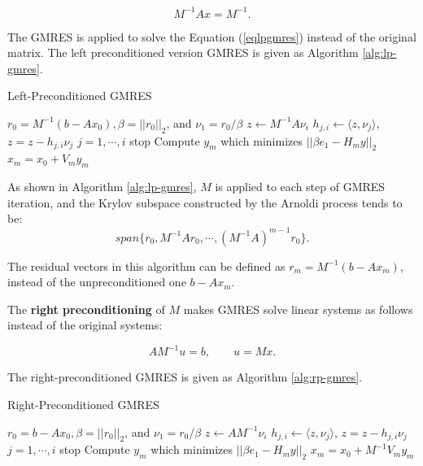 \begin{equation}
\label{eqlpgmres}
M^{-1}Ax=    M^{-1}.
\end{equation}

The GMRES is applied to solve the Equation (\ref{eqlpgmres}) instead of the original matrix. The left preconditioned version GMRES is given as Algorithm \ref{alg:lp-gmres}.

\begin{algorithm}[htbp]
	\caption{Left-Preconditioned GMRES}
	\label{alg:lp-gmres}
	\begin{algorithmic}[1]
		\State $r_0=M^{-1}(b-A x_0), \beta=||r_0||_2$, and $\nu_1=r_0/\beta$
		\State $z \leftarrow M^{-1}A\nu_i$
		\State $h_{j,i} \leftarrow \langle z,\nu_j\rangle$, $z = z- h_{j,i}\nu_j$ $j=1,\cdots,i$
		\State stop
		\Else
		\EndIf
		\EndFor
		\State Compute $y_m$ which minimizes $||\beta e_1-H_m y||_2$ 
		\State $x_m=x_0+V_my_m$
	\end{algorithmic}
\end{algorithm}

As shown in Algorithm \ref{alg:lp-gmres}, $M$ is applied to each step of GMRES iteration, and the Krylov subspace constructed by the Arnoldi process tends to be:
\begin{equation}
span\{r_0, M^{-1}Ar_0, \cdots, (M^{-1}A)^{m-1}r_0\}.
\end{equation}

The residual vectors in this algorithm can be defined as $r_m=M^{-1}(b-Ax_m)$, instead of the unpreconditioned one $b-Ax_m$.

The \textbf{right preconditioning} of $M$ makes GMRES solve linear systems as follows instead of the original systems:

\begin{equation}
AM^{-1}u=b, \qquad u = Mx.
\end{equation}

The right-preconditioned GMRES is given as Algorithm \ref{alg:rp-gmres}.

\begin{algorithm}[htbp]
	\caption{Right-Preconditioned GMRES}
	\label{alg:rp-gmres}
	\begin{algorithmic}[1]
		\State $r_0=b-A x_0, \beta=||r_0||_2$, and $\nu_1=r_0/\beta$
		\State $z \leftarrow AM^{-1}\nu_i$
		\State $h_{j,i} \leftarrow \langle z,\nu_j\rangle$, $z = z- h_{j,i}\nu_j$ $j=1,\cdots,i$
		\State stop
		\Else
		\EndIf
		\EndFor
		\State Compute $y_m$ which minimizes $||\beta e_1-H_m y||_2$ 
		\State $x_m=x_0+M^{-1}V_my_m$
	\end{algorithmic}
\end{algorithm}


